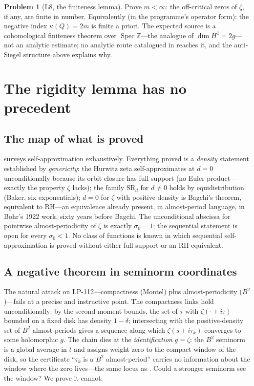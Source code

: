 \documentclass[11pt]{amsart}
\theoremstyle{definition}
\newtheorem{problem}[theorem]{Problem}
\theoremstyle{remark}
\newcommand{\bbZ}{\mathbb{Z}}
\DeclareMathOperator{\Spec}{Spec}
\begin{document}
\begin{problem}[L8, the finiteness lemma]\label{prob:L8}
Prove $m<\infty$: the off-critical zeros of $\zeta$, if any, are finite in
number. Equivalently (in the programme's operator form): the negative
index $\kappa(Q)=2m$ is finite a priori. The expected source is a
cohomological finiteness theorem over $\Spec\bbZ$---the analogue of
$\dim H^1=2g$---not an analytic estimate; no analytic route catalogued in
\cite{P40,P41,P42,P43} reaches it, and the anti-Siegel structure above
explains why.
\end{problem}

\section{The rigidity lemma has no precedent}\label{sec:rigidity}

\subsection{The map of what is proved}
\cite[]{P40} surveys self-approximation exhaustively. Everything
proved is a \emph{density} statement established by \emph{genericity}: the
Hurwitz zeta self-approximates at $d=0$ unconditionally because its orbit
closure has full support (no Euler product---exactly the property $\zeta$
lacks); the family $\mathrm{SR}_d$ for $d\neq0$ holds by equidistribution
(Baker, six exponentials); $d=0$ for $\zeta$ with positive density is
Bagchi's theorem, equivalent to RH---an equivalence already present, in
almost-period language, in Bohr's 1922 work, sixty years before Bagchi.
The unconditional abscissa for pointwise almost-periodicity of $\zeta$ is
exactly $\sigma_0=1$; the sequential statement is open for every
$\sigma_0<1$. No class of functions is known in which sequential
self-approximation is proved without either full support or an
RH-equivalent.

\subsection{A negative theorem in seminorm coordinates}
The natural attack on LP-112---compactness (Montel) plus
almost-periodicity ($B^2$)---fails at a precise and instructive point. The
compactness links hold unconditionally: by the second-moment bounds, the
set of $\tau$ with $\zeta(\cdot+i\tau)$ bounded on a fixed disk has density
$1-\delta$; intersecting with the positive-density set of $B^2$
almost-periods gives a sequence along which $\zeta(s+i\tau_k)$ converges to
some holomorphic $g$. The chain dies at the \emph{identification} $g=\zeta$:
the $B^2$ seminorm is a global average in $t$ and assigns weight zero to the
compact window of the disk, so the certificate ``$\tau_k$ is a $B^2$
almost-period'' carries no information about the window where the zero
lives---the same locus as \cite[Prop.~2.6]{P40}. Could a stronger
seminorm see the window? We prove it cannot:
\end{document}
